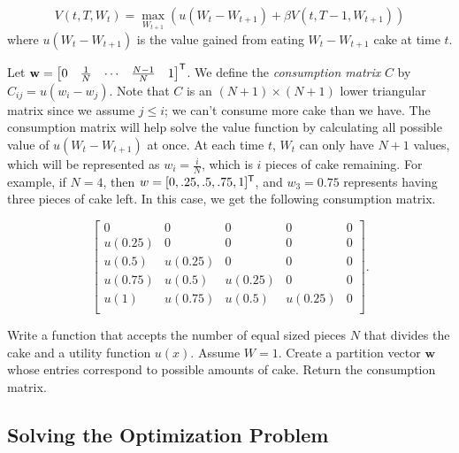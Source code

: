 \begin{equation}\label{eq:dynamicopt-do1}
V(t, T, W_{t}) = \max_{W_{t+1}} \left(u(W_{t} - W_{t+1}) + \beta V(t, T-1, W_{t+1})\right)
\end{equation}
where $u(W_t - W_{t+1})$ is the value gained from eating $W_t - W_{t+1}$ cake at time $t$.

Let $\mathbf{w} = \begin{bmatrix}0 & \frac{1}{N} & \cdots & \frac{N-1}{N} & 1\end{bmatrix}^{\mathsf T}$.
We define the \emph{consumption matrix} $C$ by $C_{ij} = u(w_i - w_j)$.
Note that $C$ is an $(N+1) \times (N+1)$ lower triangular matrix since we assume $j\leq i$; we can't consume more cake than we have.
The consumption matrix will help solve the value function by calculating all possible value of $u(W_{t} - W_{t+1})$ at once.
At each time $t$, $W_t$ can only have $N+1$ values, which will be represented as $w_i = \frac{i}{N}$, which is $i$ pieces of cake remaining.
For example, if $N=4$, then $w=[0, .25, .5, .75, 1]^{\mathsf T}$, and $w_3 = 0.75$ represents having three pieces of cake left.
In this case, we get the following consumption matrix.

\[
\begin{bmatrix}
0 & 0 & 0 & 0 & 0 \\
u(0.25) & 0 & 0 & 0 & 0 \\
u(0.5) & u(0.25) & 0 & 0 & 0 \\
u(0.75) & u(0.5) & u(0.25) & 0 & 0 \\
u(1) & u(0.75) & u(0.5) & u(0.25) & 0 \\
\end{bmatrix}.
\]

\begin{problem}{}{}

Write a function that accepts the number of equal sized pieces $N$ that divides the cake and a utility function $u(x)$.
Assume $W=1$. 
Create a partition vector $\mathbf{w}$ whose entries correspond to possible amounts of cake.
Return the consumption matrix.

\end{problem}


\subsection*{Solving the Optimization Problem}

